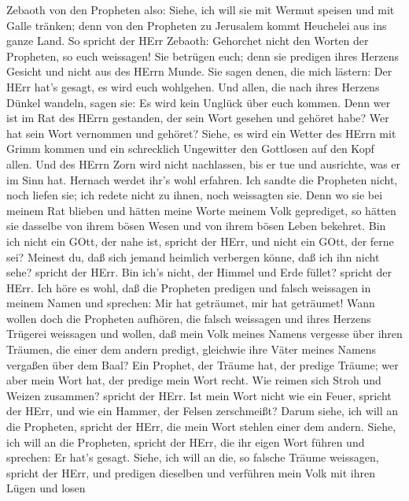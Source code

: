 Zebaoth von den Propheten also: Siehe, ich will sie mit Wermut speisen
und mit Galle tränken; denn von den Propheten zu Jerusalem kommt
Heuchelei aus ins ganze Land.  So spricht der HErr Zebaoth:
Gehorchet nicht den Worten der Propheten, so euch weissagen! Sie
betrügen euch; denn sie predigen ihres Herzens Gesicht und nicht aus des
HErrn Munde.  Sie sagen denen, die mich lästern: Der HErr
hat's gesagt, es wird euch wohlgehen. Und allen, die nach ihres Herzens
Dünkel wandeln, sagen sie: Es wird kein Unglück über euch kommen.
 Denn wer ist im Rat des HErrn gestanden, der sein Wort
gesehen und gehöret habe? Wer hat sein Wort vernommen und gehöret?
 Siehe, es wird ein Wetter des HErrn mit Grimm kommen und
ein schrecklich Ungewitter den Gottlosen auf den Kopf allen.
 Und des HErrn Zorn wird nicht nachlassen, bis er tue und
ausrichte, was er im Sinn hat. Hernach werdet ihr's wohl erfahren.
 Ich sandte die Propheten nicht, noch liefen sie; ich
redete nicht zu ihnen, noch weissagten sie.  Denn wo sie
bei meinem Rat blieben und hätten meine Worte meinem Volk geprediget, so
hätten sie dasselbe von ihrem bösen Wesen und von ihrem bösen Leben
bekehret.  Bin ich nicht ein GOtt, der nahe ist, spricht
der HErr, und nicht ein GOtt, der ferne sei?  Meinest du,
daß sich jemand heimlich verbergen könne, daß ich ihn nicht sehe?
spricht der HErr. Bin ich's nicht, der Himmel und Erde füllet? spricht
der HErr.  Ich höre es wohl, daß die Propheten predigen und
falsch weissagen in meinem Namen und sprechen: Mir hat geträumet, mir
hat geträumet!  Wann wollen doch die Propheten aufhören,
die falsch weissagen und ihres Herzens Trügerei weissagen 
und wollen, daß mein Volk meines Namens vergesse über ihren Träumen, die
einer dem andern predigt, gleichwie ihre Väter meines Namens vergaßen
über dem Baal?  Ein Prophet, der Träume hat, der predige
Träume; wer aber mein Wort hat, der predige mein Wort recht. Wie reimen
sich Stroh und Weizen zusammen? spricht der HErr.  Ist mein
Wort nicht wie ein Feuer, spricht der HErr, und wie ein Hammer, der
Felsen zerschmeißt?  Darum siehe, ich will an die
Propheten, spricht der HErr, die mein Wort stehlen einer dem andern.
 Siehe, ich will an die Propheten, spricht der HErr, die
ihr eigen Wort führen und sprechen: Er hat's gesagt. 
Siehe, ich will an die, so falsche Träume weissagen, spricht der HErr,
und predigen dieselben und verführen mein Volk mit ihren Lügen und losen
